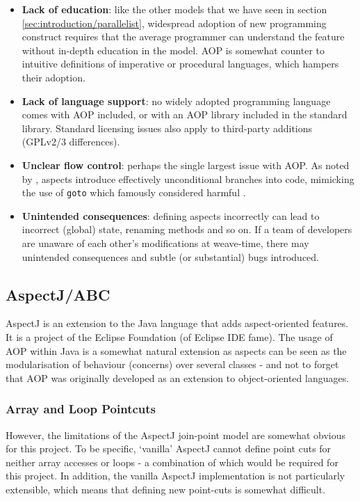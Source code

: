         \begin{itemize}
                \item \textbf{Lack of education}: like the other models that we have seen in section \ref{sec:introduction/parallelist}, widespread adoption of new programming construct requires that the average programmer can understand the feature without in-depth education in the model. AOP is somewhat counter to intuitive definitions of imperative or procedural languages, which hampers their adoption.
                \item \textbf{Lack of language support}: no widely adopted programming language comes with AOP included, or with an AOP library included in the standard library. Standard licensing issues also apply to third-party additions (\eg GPLv2/3 differences).
                \item \textbf{Unclear flow control}: perhaps the single largest issue with AOP. As noted by \citet{Constantinides2004}, aspects introduce effectively unconditional branches into code, mimicking the use of \texttt{goto} which \citeauthor{Dijkstra1968} famously considered harmful \citep{Dijkstra1968}.
                \item \textbf{Unintended consequences}: defining aspects incorrectly can lead to incorrect (global) state, \eg renaming methods and so on. If a team of developers are unaware of each other's modifications at weave-time, there may unintended consequences and subtle (or substantial) bugs introduced.
        \end{itemize}

        \subsection{AspectJ/ABC} \label{sec:instrumentation/aop/aspectj}
        AspectJ \citep{Kiczales2001} is an extension to the Java language that adds aspect-oriented features. It is a project of the Eclipse Foundation (of Eclipse IDE fame). The usage of AOP within Java is a somewhat natural extension as aspects can be seen as the modularisation of behaviour (concerns) over several classes - and not to forget that AOP was originally developed as an extension to object-oriented languages.

                \subsubsection{Array and Loop Pointcuts} \label{sec:instrumentation/aop/aspectj/arrayloop}
                However, the limitations of the AspectJ join-point model are somewhat obvious for this project. To be specific, `vanilla' AspectJ cannot define point cuts for neither array accesses or loops - a combination of which would be required for this project. In addition, the vanilla AspectJ implementation is not particularly extensible, which means that defining new point-cuts is somewhat difficult.

